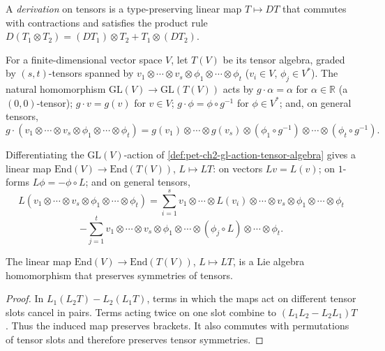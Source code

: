 \begin{definition}
  \label{def:pet-ch2-tensor-derivation}
  \leanok
  A \emph{derivation} on tensors is a type-preserving linear map
  $T\mapsto DT$ that commutes with contractions and satisfies the product rule
  $D(T_1\otimes T_2)=(DT_1)\otimes T_2+T_1\otimes(DT_2)$.
\end{definition}

\begin{definition}
  \label{def:pet-ch2-gl-action-tensor-algebra}
  \leanok
  For a finite-dimensional vector space $V$, let $T(V)$ be its tensor algebra,
  graded by $(s,t)$-tensors spanned by
  $v_1\otimes\cdots\otimes v_s\otimes\phi_1\otimes\cdots\otimes\phi_t$
  ($v_i\in V$, $\phi_j\in V^*$). The natural homomorphism
  $\mathrm{GL}(V)\to\mathrm{GL}(T(V))$ acts by $g\cdot\alpha=\alpha$ for
  $\alpha\in\mathbb{R}$ (a $(0,0)$-tensor); $g\cdot v=g(v)$ for $v\in V$;
  $g\cdot\phi=\phi\circ g^{-1}$ for $\phi\in V^*$; and, on general tensors,
  \[
    g\cdot(v_1\otimes\cdots\otimes v_s\otimes\phi_1\otimes\cdots\otimes\phi_t)
    = g(v_1)\otimes\cdots\otimes g(v_s)\otimes(\phi_1\circ g^{-1})\otimes\cdots\otimes(\phi_t\circ g^{-1}).
  \]
\end{definition}

\begin{definition}
  \label{def:pet-ch2-endomorphism-derivation}
  \leanok
  Differentiating the $\mathrm{GL}(V)$-action of
  \cref{def:pet-ch2-gl-action-tensor-algebra} gives a linear map
  $\mathrm{End}(V)\to\mathrm{End}(T(V))$, $L\mapsto LT$: on vectors $Lv=L(v)$;
  on $1$-forms $L\phi=-\phi\circ L$; and on general tensors,
  \[
    L(v_1\otimes\cdots\otimes v_s\otimes\phi_1\otimes\cdots\otimes\phi_t)
    = \sum_{i=1}^sv_1\otimes\cdots\otimes L(v_i)\otimes\cdots\otimes v_s\otimes\phi_1\otimes\cdots\otimes\phi_t
  \]
  \[
    -\sum_{j=1}^tv_1\otimes\cdots\otimes v_s\otimes\phi_1\otimes\cdots\otimes(\phi_j\circ L)\otimes\cdots\otimes\phi_t.
  \]
\end{definition}

\begin{proposition}
  \label{prop:pet-ch2-endomorphism-lie-algebra-hom}
  \leanok
  The linear map $\mathrm{End}(V)\to\mathrm{End}(T(V))$, $L\mapsto LT$, is a
  Lie algebra homomorphism that preserves symmetries of tensors.
\end{proposition}
\begin{proof}
  \leanok
  \sketch
  In
  $L_1(L_2T)-L_2(L_1T)$, terms in which the maps act on different tensor
  slots cancel in pairs. Terms acting twice on one slot combine to
  $(L_1L_2-L_2L_1)T$. Thus the induced map preserves brackets. It also
  commutes with permutations of tensor slots and therefore preserves tensor
  symmetries.
\end{proof}

